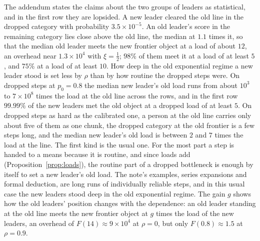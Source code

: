 \documentclass{article}
\begin{document}
The addendum states the claims about the two groups of leaders as statistical, and in the first row they are lopsided. A new leader cleared the old line in the dropped category with probability $3.5 \times 10^{-5}$. An old leader's score in the remaining category lies close above the old line, the median at $1.1$ times it, so that the median old leader meets the new frontier object at a load of about $12$, an overhead near $1.3 \times 10^{4}$ with $\xi = \tfrac12$; $98\%$ of them meet it at a load of at least $5$, and $75\%$ at a load of at least $10$. How deep in the old exponential regime a new leader stood is set less by $\rho$ than by how routine the dropped steps were. On dropped steps at $p_0 = 0.8$ the median new leader's old load runs from about $10^{3}$ to $7 \times 10^{8}$ times the load at the old line across the rows, and in the first row $99.99\%$ of the new leaders met the old object at a dropped load of at least $5$. On dropped steps as hard as the calibrated one, a person at the old line carries only about five of them as one chunk, the dropped category at the old frontier is a few steps long, and the median new leader's old load is between $2$ and $7$ times the load at the line. The first kind is the usual one. For the most part a step is handed to a means because it is routine, and since loads add (Proposition~\ref{prop:loads}), the routine part of a dropped bottleneck is enough by itself to set a new leader's old load. The note's examples, series expansions and formal deduction, are long runs of individually reliable steps, and in this usual case the new leaders stood deep in the old exponential regime. The gain $g$ shows how the old leaders' position changes with the dependence: an old leader standing at the old line meets the new frontier object at $g$ times the load of the new leaders, an overhead of $F(14) \approx 9 \times 10^{4}$ at $\rho = 0$, but only $F(0.8) \approx 1.5$ at $\rho = 0.9$.
\end{document}
